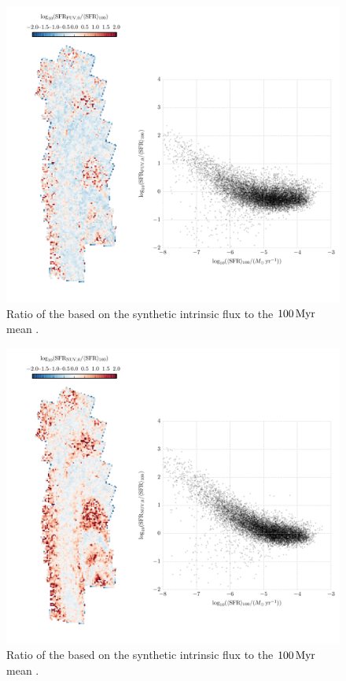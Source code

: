 \begin{figure}
\centering
\includegraphics[width=\textwidth]{m31flux-figures/sfr_fuv0-vs-mean.pdf}
\caption[Ratio of the \sfr{} based on the synthetic intrinsic \fuv{} flux
    to the $100\myr$ mean \sfr{}.]{Ratio of the \sfr{} based on the synthetic
    intrinsic \fuv{} flux to the $100\myr$ mean \sfr{}.
}
\label{fig:mfx:fuvzsfrratio}
\end{figure}


\begin{figure}
\centering
\includegraphics[width=\textwidth]{m31flux-figures/sfr_nuv0-vs-mean.pdf}
\caption[Ratio of the \sfr{} based on the synthetic intrinsic \nuv{} flux
    to the $100\myr$ mean \sfr{}.]{Ratio of the \sfr{} based on the synthetic
    intrinsic \fuv{} flux to the $100\myr$ mean \sfr{}.
}
\label{fig:mfx:nuvzsfrratio}
\end{figure}



